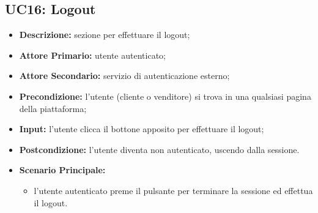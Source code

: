 \subsection{UC16: Logout}
\label{sec:UC16}
\begin{itemize}
    \item \textbf{Descrizione:} sezione per effettuare il logout;
    \item \textbf{Attore Primario:} utente autenticato;
    \item \textbf{Attore Secondario:} servizio di autenticazione esterno;
    \item \textbf{Precondizione:} l'utente (cliente o venditore) si trova in una qualsiasi pagina della piattaforma;
    \item \textbf{Input:} l'utente clicca il bottone apposito per effettuare il logout;
    \item \textbf{Postcondizione:} l'utente diventa non autenticato, uscendo dalla sessione.
    \item \textbf{Scenario Principale:}
    \begin{itemize}
        \item l'utente autenticato preme il pulsante per terminare la sessione ed effettua il logout.
    \end{itemize}
\end{itemize}